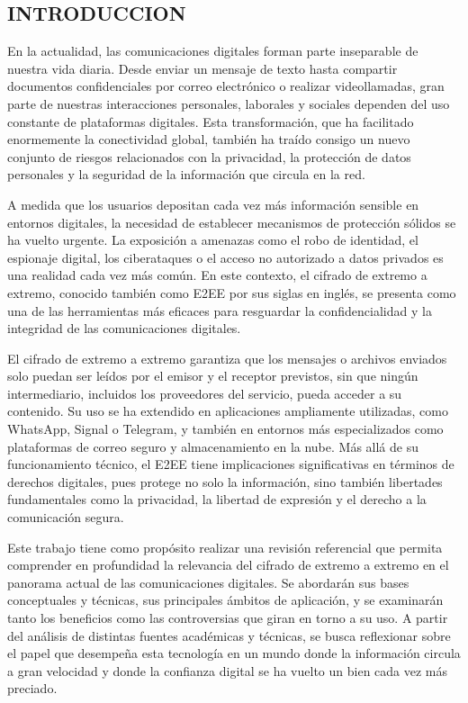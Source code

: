 \documentclass[spanish,12pt,a4paper]{article}
\begin{document}
\begin{multicols}{2}
		\section*{\normalsize INTRODUCCION}
		En la actualidad, las comunicaciones digitales forman parte inseparable de nuestra vida diaria. Desde enviar un mensaje de texto hasta compartir documentos confidenciales por correo electrónico o realizar videollamadas, gran parte de nuestras interacciones personales, laborales y sociales dependen del uso constante de plataformas digitales. Esta transformación, que ha facilitado enormemente la conectividad global, también ha traído consigo un nuevo conjunto de riesgos relacionados con la privacidad, la protección de datos personales y la seguridad de la información que circula en la red.
		
		A medida que los usuarios depositan cada vez más información sensible en entornos digitales, la necesidad de establecer mecanismos de protección sólidos se ha vuelto urgente. La exposición a amenazas como el robo de identidad, el espionaje digital, los ciberataques o el acceso no autorizado a datos privados es una realidad cada vez más común. En este contexto, el cifrado de extremo a extremo, conocido también como E2EE por sus siglas en inglés, se presenta como una de las herramientas más eficaces para resguardar la confidencialidad y la integridad de las comunicaciones digitales.
		
		El cifrado de extremo a extremo garantiza que los mensajes o archivos enviados solo puedan ser leídos por el emisor y el receptor previstos, sin que ningún intermediario, incluidos los proveedores del servicio, pueda acceder a su contenido. Su uso se ha extendido en aplicaciones ampliamente utilizadas, como WhatsApp, Signal o Telegram, y también en entornos más especializados como plataformas de correo seguro y almacenamiento en la nube. Más allá de su funcionamiento técnico, el E2EE tiene implicaciones significativas en términos de derechos digitales, pues protege no solo la información, sino también libertades fundamentales como la privacidad, la libertad de expresión y el derecho a la comunicación segura.
		
		Este trabajo tiene como propósito realizar una revisión referencial que permita comprender en profundidad la relevancia del cifrado de extremo a extremo en el panorama actual de las comunicaciones digitales. Se abordarán sus bases conceptuales y técnicas, sus principales ámbitos de aplicación, y se examinarán tanto los beneficios como las controversias que giran en torno a su uso. A partir del análisis de distintas fuentes académicas y técnicas, se busca reflexionar sobre el papel que desempeña esta tecnología en un mundo donde la información circula a gran velocidad y donde la confianza digital se ha vuelto un bien cada vez más preciado.
		

\end{multicols}
\end{document}
